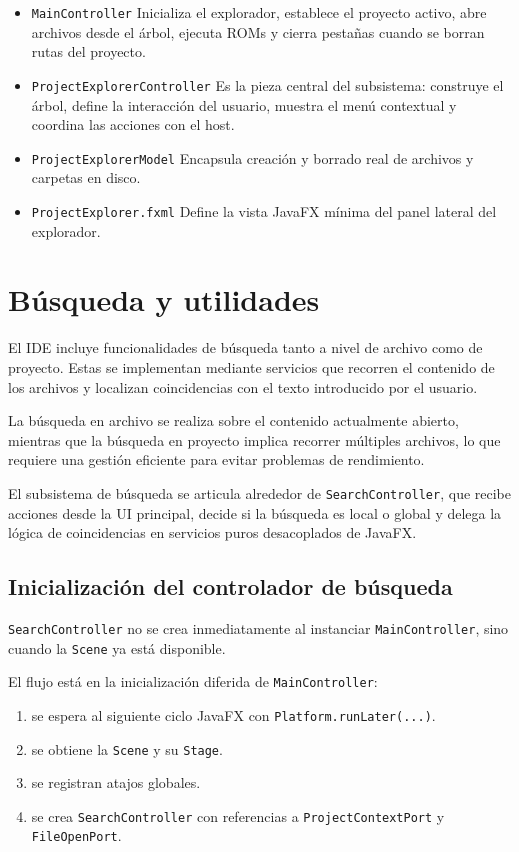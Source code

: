 \documentclass[../../main.tex]{subfiles}
\begin{document}
\begin{itemize}
    \item \lstinline|MainController| Inicializa el explorador, establece el proyecto activo, abre archivos desde el árbol, ejecuta ROMs y cierra pestañas cuando se borran rutas del proyecto.
    \item \lstinline|ProjectExplorerController| Es la pieza central del subsistema: construye el árbol, define la interacción del usuario, muestra el menú contextual y coordina las acciones con el host.
    \item \lstinline|ProjectExplorerModel| Encapsula creación y borrado real de archivos y carpetas en disco.
    \item \lstinline|ProjectExplorer.fxml| Define la vista JavaFX mínima del panel lateral del explorador.
\end{itemize}

\clearpage

\section{Búsqueda y utilidades}

El IDE incluye funcionalidades de búsqueda tanto a nivel de archivo como de proyecto. Estas se implementan mediante servicios que recorren el contenido de los archivos y localizan coincidencias con el texto introducido por el usuario.

La búsqueda en archivo se realiza sobre el contenido actualmente abierto, mientras que la búsqueda en proyecto implica recorrer múltiples archivos, lo que requiere una gestión eficiente para evitar problemas de rendimiento.

El subsistema de búsqueda se articula alrededor de \lstinline|SearchController|, que recibe acciones desde la UI principal, decide si la búsqueda es local o global y delega la lógica de coincidencias en servicios puros desacoplados de JavaFX.

\subsection{Inicialización del controlador de búsqueda}

\lstinline|SearchController| no se crea inmediatamente al instanciar \lstinline|MainController|, sino cuando la \lstinline|Scene| ya está disponible.

El flujo está en la inicialización diferida de \lstinline|MainController|:

\begin{enumerate}
    \item se espera al siguiente ciclo JavaFX con \lstinline|Platform.runLater(...)|.
    \item se obtiene la \lstinline|Scene| y su \lstinline|Stage|.
    \item se registran atajos globales.
    \item se crea \lstinline|SearchController| con referencias a \lstinline|ProjectContextPort| y \lstinline|FileOpenPort|.
\end{enumerate}
\end{document}
